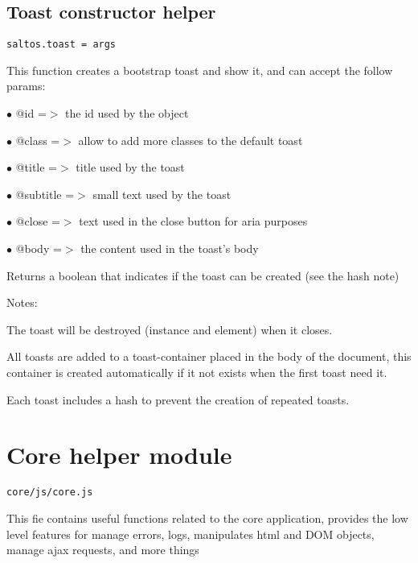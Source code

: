 \documentclass[a4paper]{book}
\begin{document}
\hypertarget{toc416}{}
\subsection{Toast constructor helper}

\begin{lstlisting}
saltos.toast = args
\end{lstlisting}

This function creates a bootstrap toast and show it, and can accept the follow params:

\begin{compactitem}
\item[\color{myblue}$\bullet$] @id       =$>$ the id used by the object
\item[\color{myblue}$\bullet$] @class    =$>$ allow to add more classes to the default toast
\item[\color{myblue}$\bullet$] @title    =$>$ title used by the toast
\item[\color{myblue}$\bullet$] @subtitle =$>$ small text used by the toast
\item[\color{myblue}$\bullet$] @close    =$>$ text used in the close button for aria purposes
\item[\color{myblue}$\bullet$] @body     =$>$ the content used in the toast's body
\end{compactitem}

Returns a boolean that indicates if the toast can be created (see the hash note)

Notes:

The toast will be destroyed (instance and element) when it closes.

All toasts are added to a toast-container placed in the body of the document, this container
is created automatically if it not exists when the first toast need it.

Each toast includes a hash to prevent the creation of repeated toasts.

\hypertarget{toc417}{}
\section{Core helper module}

\begin{lstlisting}
core/js/core.js
\end{lstlisting}

This fie contains useful functions related to the core application, provides the low level features
for manage errors, logs, manipulates html and DOM objects, manage ajax requests, and more things
\end{document}
